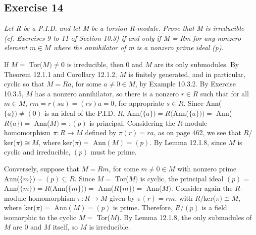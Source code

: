 \subsection*{Exercise 14}
\begin{framed}
\textit{Let R be a P.I.D. and let M be a torsion R-module. Prove that M is irreducible (cf. Exercises 9 to 11 of Section 10.3) if and only if M = Rm for any nonzero element $m \in M$ where the annihilator of m is a nonzero prime ideal (p).}
\end{framed}

If $M =$ Tor($M) \not= 0$ is irreducible, then 0 and $M$ are its only submodules. By Theorem 12.1.1 and Corollary 12.1.2, $M$ is finitely generated, and in particular, cyclic so that $M = Ra$, for some $a \not= 0 \in M$, by Example 10.3.2. By Exercise 10.3.5, $M$ has a nonzero annihilator, so there is a nonzero $r \in R$ such that for all $m \in M$, $rm = r(sa) = (rs)a = 0$, for appropriate $s \in R$. Since Ann($\{a\}) \not= (0)$ is an ideal of the P.I.D. $R$, Ann($\{a\}) = R($Ann($\{a\})) =$ Ann($R\{a\}) =$ Ann($M) =: (p)$ is principal. Considering the $R$-module homomorphism $\pi: R \rightarrow M$ defined by $\pi(r) = ra$, as on page 462, we see that $R/$ker($\pi) \cong M$, where ker($\pi) =$ Ann$(M) = (p)$. By Lemma 12.1.8, since $M$ is cyclic and irreducible, $(p)$ must be prime.

Conversely, suppose that $M = Rm$, for some $m \not= 0 \in M$ with nonzero prime Ann($\{m\}) = (p) \subseteq R$. Since $M =$ Tor($M)$ is cyclic, the principal ideal $(p)$ = Ann($\{m\}) = R($Ann($\{m\})) =$ Ann($R\{m\}) =$ Ann($M)$. Consider again the $R$-module homomorphism $\pi: R \rightarrow M$ given by $\pi(r) = rm$, with $R/$ker($\pi) \cong M$, where ker($\pi) =$ Ann$(M) = (p)$ is prime. Therefore, $R/(p)$ is a field isomorphic to the cyclic $M =$ Tor($M$). By Lemma 12.1.8, the only submodules of $M$ are 0 and $M$ itself, so $M$ is irreducible.